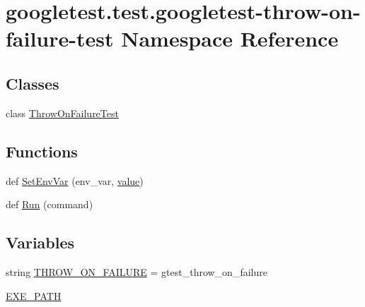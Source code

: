 \hypertarget{namespacegoogletest_1_1test_1_1googletest-throw-on-failure-test}{}\section{googletest.\+test.\+googletest-\/throw-\/on-\/failure-\/test Namespace Reference}
\label{namespacegoogletest_1_1test_1_1googletest-throw-on-failure-test}
\subsection*{Classes}
\begin{DoxyCompactItemize}
\item 
class \mbox{\hyperlink{classgoogletest_1_1test_1_1googletest-throw-on-failure-test_1_1_throw_on_failure_test}{Throw\+On\+Failure\+Test}}
\end{DoxyCompactItemize}
\subsection*{Functions}
\begin{DoxyCompactItemize}
\item 
def \mbox{\hyperlink{namespacegoogletest_1_1test_1_1googletest-throw-on-failure-test_af4414910b3110bee15ecd5463f02bd9d}{Set\+Env\+Var}} (env\+\_\+var, \mbox{\hyperlink{_obj__test_2lib_2googletest-master_2googlemock_2test_2gmock-matchers__test_8cc_a337b8a670efc0b086ad3af163f3121b6}{value}})
\item 
def \mbox{\hyperlink{namespacegoogletest_1_1test_1_1googletest-throw-on-failure-test_a8f6f5f7c354ddfb17bb80259fae9a4e3}{Run}} (command)
\end{DoxyCompactItemize}
\subsection*{Variables}
\begin{DoxyCompactItemize}
\item 
string \mbox{\hyperlink{namespacegoogletest_1_1test_1_1googletest-throw-on-failure-test_aaaed5791930e06626fad979c1c3becce}{T\+H\+R\+O\+W\+\_\+\+O\+N\+\_\+\+F\+A\+I\+L\+U\+RE}} = \textquotesingle{}gtest\+\_\+throw\+\_\+on\+\_\+failure\textquotesingle{}
\item 
\mbox{\hyperlink{namespacegoogletest_1_1test_1_1googletest-throw-on-failure-test_ad7269f0f1980cc8f1c5831cfb436b6d2}{E\+X\+E\+\_\+\+P\+A\+TH}}
\end{DoxyCompactItemize}


